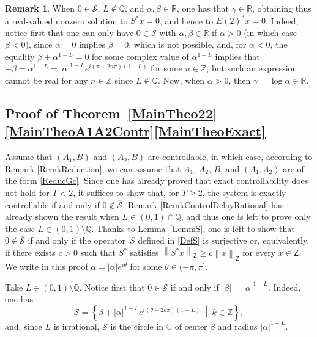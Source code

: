\documentclass[JEP,XML,SOM,Unicode]{cedram}
\theoremstyle{plain}
\theoremstyle{definition}
\newtheorem{remk}[theo]{Remark}
\newcommand{\midsuchthat}{\;\middle|\:}
\newcommand{\norm}[1]{\left\lVert #1\right\lVert}
\newcommand{\abs}[1]{\left\lvert #1\right \rvert}
\begin{document}
\begin{remk}
When $0 \in \mathcal S$, $L \notin \mathbb Q$, and $\alpha, \beta \in \mathbb R$, one has that $\gamma \in \mathbb R$, obtaining thus a real-valued nonzero solution to $S^\ast x = 0$, and hence to $E(2)^\ast x = 0$. Indeed, notice first that one can only have $0 \in \mathcal S$ with $\alpha, \beta \in \mathbb R$ if $\alpha > 0$ (in which case $\beta < 0$), since $\alpha = 0$ implies $\beta = 0$, which is not possible, and, for $\alpha < 0$, the equality $\beta + \alpha^{1 - L} = 0$ for some complex value of $\alpha^{1 - L}$ implies that $-\beta = \alpha^{1-L} = \abs{\alpha}^{1-L} e^{i (\pi + 2 n \pi)(1 - L)}$ for some $n \in \mathbb Z$, but such an expression cannot be real for any $n \in \mathbb Z$ since $L \notin \mathbb Q$. Now, when $\alpha > 0$, then $\gamma = \log\alpha \in \mathbb R$.
\end{remk}

\subsection{Proof of Theorem~\ref{MainTheo22}\eqref{MainTheoA1A2Contr}\eqref{MainTheoExact}}
Assume that $(A_1, B)$ and $(A_2, B)$ are controllable, in which case, according to Remark \ref{RemkReduction}, we can assume that $A_1$, $A_2$, $B$, and $(\Lambda_1, \Lambda_2)$ are of the form \eqref{ReducGc}. Since one has already proved that exact controllability does not hold for $T < 2$, it suffices to show that, for $T \geq 2$, the system is exactly controllable if and only if $0 \notin \overline{\mathcal S}$. Remark \ref{RemkControlDelayRational} has already shown the result when $L \in (0, 1) \cap \mathbb Q$, and thus one is left to prove only the case $L \in (0, 1) \setminus \mathbb Q$. Thanks to Lemma~\ref{LemmS}, one is left to show that $0 \notin \overline{\mathcal S}$ if and only if the operator~$S$ defined in \eqref{DefS} is surjective or, equivalently, if there exists $c > 0$ such that $S^\ast$ satisfies $\norm{S^\ast x}_{\mathsf Z} \geq c \norm{x}_{\mathsf Z}$ for every $x \in \mathsf Z$. We write in this proof $\alpha = \abs{\alpha} e^{i\theta}$ for some $\theta \in (-\pi, \pi]$.

Take $L \in (0, 1) \setminus \mathbb Q$. Notice first that $0 \in \overline{\mathcal S}$ if and only if $\abs{\beta} = \abs{\alpha}^{1-L}$. Indeed, one has
\[
\mathcal S = \left\{\beta + \abs{\alpha}^{1 - L} e^{i (\theta + 2 k \pi)\left(1 - L\right)} \midsuchthat k \in \mathbb Z\right\},
\]
and, since $L$ is irrational, $\overline{\mathcal S}$ is the circle in $\mathbb C$ of center $\beta$ and radius $\abs{\alpha}^{1-L}$.
\end{document}
